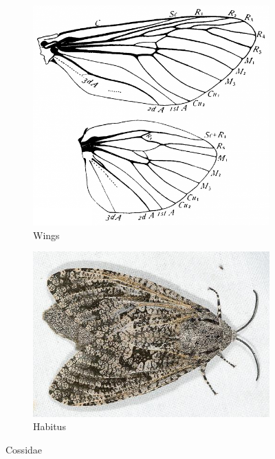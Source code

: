 \documentclass[letterpaper, 11pt]{article}
\begin{document}
\begin{figure}[ht!]
    \centering
    \begin{subfigure}[ht!]{0.38\textwidth}
        \includegraphics[width=\textwidth]{CossidWings}
        \caption{Wings \citep[Fig. 343]{comstock1918wings}}
        \label{fig:cossid1}
    \end{subfigure}
    \qquad %
    \begin{subfigure}[ht!]{0.48\textwidth}
        \includegraphics[width=\textwidth]{image43}
        \caption{Habitus}
        \label{fig:cossid2}
    \end{subfigure}
    \caption{Cossidae}\label{fig:cossids}
\end{figure}
\end{document}
